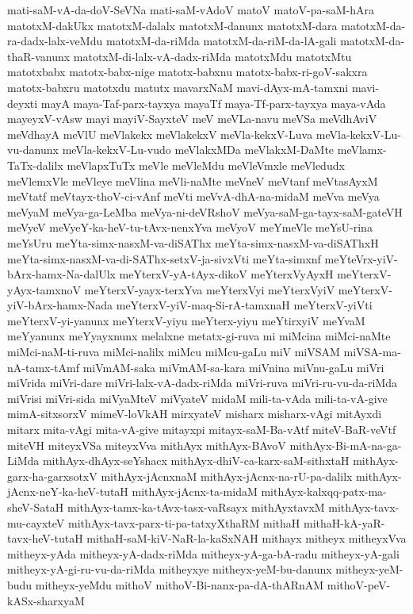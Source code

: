 {mati-saM-vA-da-doV-SeVNa
mati-saM-vAdoV
matoV
matoV-pa-saM-hAra
matotxM-dakUkx
matotxM-dalalx
matotxM-danunx
matotxM-dara
matotxM-da-ra-dadx-lalx-veMdu
matotxM-da-riMda
matotxM-da-riM-da-lA-gali
matotxM-da-thaR-vanunx
matotxM-di-lalx-vA-dadx-riMda
matotxMdu
matotxMtu
matotxbabx
matotx-babx-nige
matotx-babxnu
matotx-babx-ri-goV-sakxra
matotx-babxru
matotxdu
matutx
mavarxNaM
mavi-dAyx-mA-tamxni
mavi-deyxti
mayA
maya-Taf-parx-tayxya
mayaTf
maya-Tf-parx-tayxya
maya-vAda
mayeyxV-vAsw
mayi
mayiV-SayxteV
meV
meVLa-navu
meVSa
meVdhAviV
meVdhayA
meVlU
meVlakekx
meVlakekxV
meVla-kekxV-Luva
meVla-kekxV-Lu-vu-danunx
meVla-kekxV-Lu-vudo
meVlakxMDa
meVlakxM-DaMte
meVlamx-TaTx-dalilx
meVlapxTuTx
meVle
meVleMdu
meVleVmxle
meVledudx
meVlemxVle
meVleye
meVlina
meVli-naMte
meVneV
meVtanf
meVtasAyxM
meVtatf
meVtayx-thoV-ci-vAnf
meVti
meVvA-dhA-na-midaM
meVva
meVya
meVyaM
meVya-ga-LeMba
meVya-ni-deVRshoV
meVya-saM-ga-tayx-saM-gateVH
meVyeV
meVyeY-ka-heV-tu-tAvx-nenxYva
meVyoV
meYmeVle
meYsU-rina
meYsUru
meYta-simx-nasxM-va-diSAThx
meYta-simx-nasxM-va-diSAThxH
meYta-simx-nasxM-va-di-SAThx-setxV-ja-sivxVti
meYta-simxnf
meYteVrx-yiV-bArx-hamx-Na-dalUlx
meYterxV-yA-tAyx-dikoV
meYterxVyAyxH
meYterxV-yAyx-tamxnoV
meYterxV-yayx-terxYva
meYterxVyi
meYterxVyiV
meYterxV-yiV-bArx-hamx-Nada
meYterxV-yiV-maq-Si-rA-tamxnaH
meYterxV-yiVti
meYterxV-yi-yanunx
meYterxV-yiyu
meYterx-yiyu
meYtirxyiV
meYvaM
meYyanunx
meYyayxnunx
melalxne
metatx-gi-ruva
mi
miMcina
miMci-naMte
miMci-naM-ti-ruva
miMci-nalilx
miMcu
miMcu-gaLu
miV
miVSAM
miVSA-ma-nA-tamx-tAmf
miVmAM-saka
miVmAM-sa-kara
miVnina
miVnu-gaLu
miVri
miVrida
miVri-dare
miVri-lalx-vA-dadx-riMda
miVri-ruva
miVri-ru-vu-da-riMda
miVrisi
miVri-sida
miVyaMteV
miVyateV
midaM
mili-ta-vAda
mili-ta-vA-give
mimA-sitxsorxV
mimeV-loVkAH
mirxyateV
misharx
misharx-vAgi
mitAyxdi
mitarx
mita-vAgi
mita-vA-give
mitayxpi
mitayx-saM-Ba-vAtf
miteV-BaR-veVtf
miteVH
miteyxVSa
miteyxVva
mithAyx
mithAyx-BAvoV
mithAyx-Bi-mA-na-ga-LiMda
mithAyx-dhAyx-seYshacx
mithAyx-dhiV-ca-karx-saM-sithxtaH
mithAyx-garx-ha-garxsotxV
mithAyx-jAcnxnaM
mithAyx-jAcnx-na-rU-pa-dalilx
mithAyx-jAcnx-neY-ka-heV-tutaH
mithAyx-jAcnx-ta-midaM
mithAyx-kalxqq-patx-ma-sheV-SataH
mithAyx-tamx-ka-tAvx-tasx-vaRsayx
mithAyxtavxM
mithAyx-tavx-mu-cayxteV
mithAyx-tavx-parx-ti-pa-tatxyXthaRM
mithaH
mithaH-kA-yaR-tavx-heV-tutaH
mithaH-saM-kiV-NaR-la-kaSxNAH
mithayx
mitheyx
mitheyxVva
mitheyx-yAda
mitheyx-yA-dadx-riMda
mitheyx-yA-ga-bA-radu
mitheyx-yA-gali
mitheyx-yA-gi-ru-vu-da-riMda
mitheyxye
mitheyx-yeM-bu-danunx
mitheyx-yeM-budu
mitheyx-yeMdu
mithoV
mithoV-Bi-nanx-pa-dA-thARnAM
mithoV-peV-kASx-sharxyaM
}
